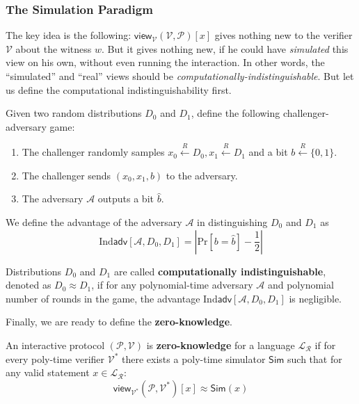 \documentclass[../lecture-notes.tex]{subfiles}
\begin{document}
\subsubsection{The Simulation Paradigm}

The key idea is the following: $\mathsf{view}_{\mathcal{V}}(\mathcal{V}, \mathcal{P})[x]$ gives nothing new to the verifier $\mathcal{V}$ about the witness $w$. But it gives nothing new, if he could have \textit{simulated} this view on his own, without even running the interaction. In other words, the ``simulated'' and ``real'' views should be \textit{computationally-indistinguishable}. But let us define the computational indistinguishability first.

\begin{definition}
    Given two random distributions $D_0$ and $D_1$, define the following challenger-adversary game:
    \begin{enumerate}
        \item The challenger randomly samples $x_0 \xleftarrow{R} D_0, x_1 \xleftarrow{R} D_1$ and a bit $b \xleftarrow{R} \{0,1\}$.
        \item The challenger sends $(x_0, x_1, b)$ to the adversary.
        \item The adversary $\mathcal{A}$ outputs a bit $\hat{b}$.
    \end{enumerate}

    We define the advantage of the adversary $\mathcal{A}$ in distinguishing $D_0$ and $D_1$ as 
    \begin{equation*}
        \text{Ind}\textsf{adv}[\mathcal{A}, D_0, D_1] = \left|\text{Pr}[b = \hat{b}] - \frac{1}{2}\right|
    \end{equation*}

    Distributions $D_0$ and $D_1$ are called \textbf{computationally indistinguishable}, denoted as $D_0 \approx D_1$, if for any polynomial-time adversary $\mathcal{A}$ and polynomial number of rounds in the game, the advantage $\text{Ind}\textsf{adv}[\mathcal{A}, D_0, D_1]$ is negligible.
\end{definition}

Finally, we are ready to define the \textbf{zero-knowledge}.

\begin{definition}
    An interactive protocol $(\mathcal{P}, \mathcal{V})$ is \textbf{zero-knowledge} for a language $\mathcal{L}_{\mathcal{R}}$ if for every poly-time verifier $\mathcal{V}^*$ there exists a poly-time simulator $\mathsf{Sim}$ such that for any valid statement $x \in \mathcal{L}_{\mathcal{R}}$:
    \begin{equation*}
        \mathsf{view}_{\mathcal{V}^*}(\mathcal{P}, \mathcal{V}^*)[x] \approx \mathsf{Sim}(x)
    \end{equation*}
\end{definition}
\end{document}
